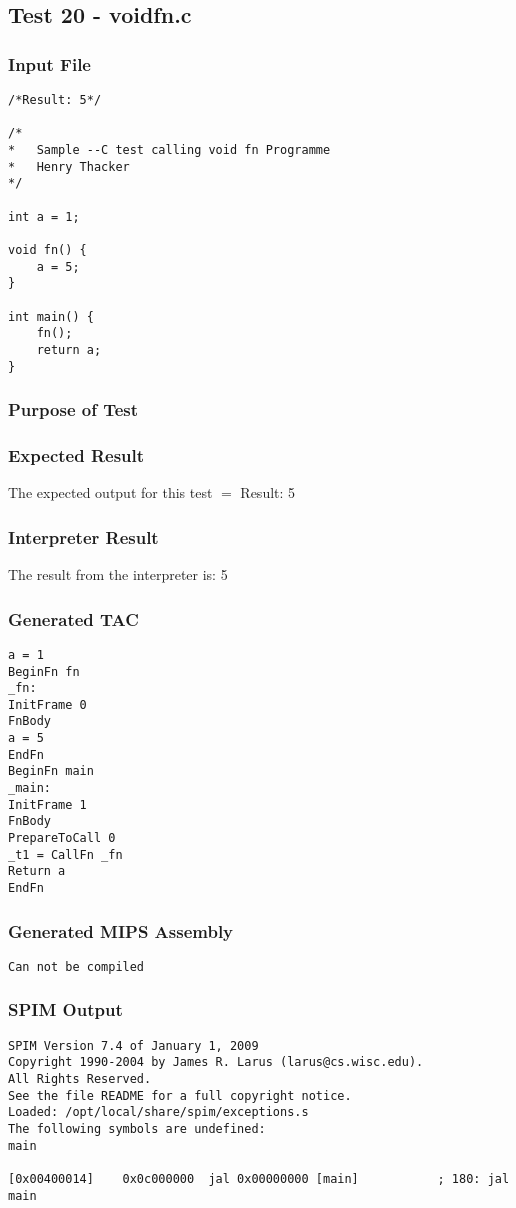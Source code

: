 \subsection{Test 20 - voidfn.c}
\subsubsection{Input File}
\begin{lstlisting}[showstringspaces=false,breaklines=true,backgroundcolor=\color{light-gray}, captionpos=b]
/*Result: 5*/

/*
*	Sample --C test calling void fn Programme
*	Henry Thacker
*/

int a = 1;

void fn() {
	a = 5;
}

int main() {
	fn();
	return a;
}
\end{lstlisting}\subsubsection{Purpose of Test}

\subsubsection{Expected Result}
The expected output for this test $=$ Result: 5
\subsubsection{Interpreter Result}
The result from the interpreter is: 5
\subsubsection{Generated TAC}
\begin{lstlisting}[showstringspaces=false,breaklines=true,backgroundcolor=\color{light-gray}, captionpos=b]
a = 1
BeginFn fn
_fn:
InitFrame 0
FnBody
a = 5
EndFn
BeginFn main
_main:
InitFrame 1
FnBody
PrepareToCall 0
_t1 = CallFn _fn
Return a
EndFn

\end{lstlisting}\subsubsection{Generated MIPS Assembly}
\begin{lstlisting}[showstringspaces=false,breaklines=true,backgroundcolor=\color{light-gray}, captionpos=b]
Can not be compiled
\end{lstlisting}\subsubsection{SPIM Output}
\begin{verbatim}
SPIM Version 7.4 of January 1, 2009
Copyright 1990-2004 by James R. Larus (larus@cs.wisc.edu).
All Rights Reserved.
See the file README for a full copyright notice.
Loaded: /opt/local/share/spim/exceptions.s
The following symbols are undefined:
main

[0x00400014]	0x0c000000  jal 0x00000000 [main]           ; 180: jal main
\end{verbatim}
